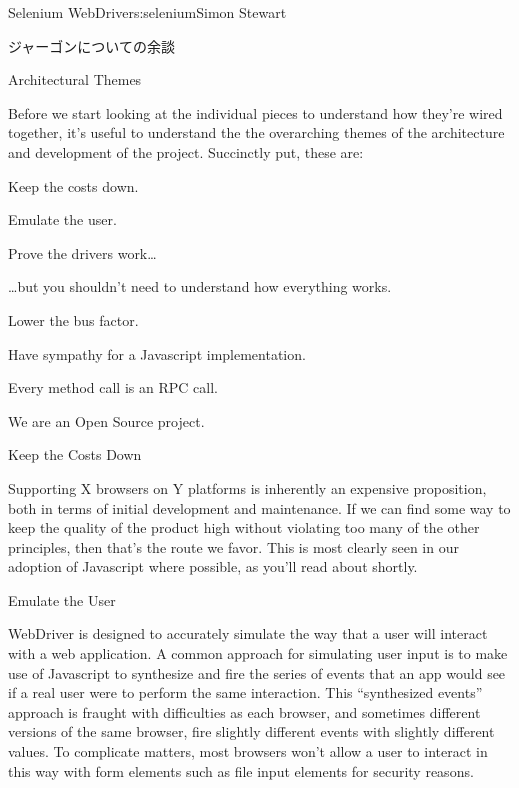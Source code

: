 \begin{aosachapter}{Selenium WebDriver}{s:selenium}{Simon Stewart}
\begin{aosasect1}{ジャーゴンについての余談}
\end{aosasect1}

\begin{aosasect1}{Architectural Themes}

Before we start looking at the individual pieces to understand how
they're wired together, it's useful to understand the the overarching
themes of the architecture and development of the project. Succinctly
put, these are:

\begin{aosaitemize}

\item Keep the costs down.

\item Emulate the user.

\item Prove the drivers work{\ldots}

\item {\ldots}but you shouldn't need to understand how everything works.

\item Lower the bus factor.

\item Have sympathy for a Javascript implementation.

\item Every method call is an RPC call.

\item We are an Open Source project.

\end{aosaitemize}

\begin{aosasect2}{Keep the Costs Down}

Supporting X browsers on Y platforms is inherently an expensive
proposition, both in terms of initial development and maintenance. If
we can find some way to keep the quality of the product high without
violating too many of the other principles, then that's the route we
favor. This is most clearly seen in our adoption of Javascript where
possible, as you'll read about shortly.

\end{aosasect2}

\begin{aosasect2}{Emulate the User}

WebDriver is designed to accurately simulate the way that a user will
interact with a web application. A common approach for simulating user
input is to make use of Javascript to synthesize and fire the series
of events that an app would see if a real user were to perform the
same interaction. This ``synthesized events'' approach is fraught with
difficulties as each browser, and sometimes different versions of the
same browser, fire slightly different events with slightly different
values. To complicate matters, most browsers won't allow a user to
interact in this way with form elements such as file input
elements for security reasons.


\end{aosasect2}
\end{aosasect1}
\end{aosachapter}

